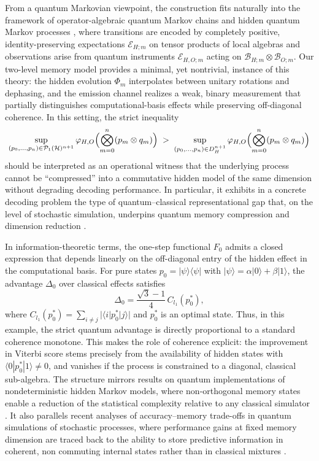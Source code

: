 \documentclass[12pt, reco]{article}
\begin{document}
From a quantum Markovian viewpoint, the construction fits naturally into the framework of operator-algebraic quantum Markov chains \cite{accardi1974} and hidden quantum Markov processes  \cite{AGLS24Q}, where transitions are encoded by completely positive, identity-preserving expectations \(\mathcal{E}_{H;m}\) on tensor products of local algebras and observations arise from quantum instruments \(\mathcal{E}_{H,O;m}\) acting on \(\mathcal{B}_{H;m}\otimes\mathcal{B}_{O;m}\). Our two-level memory model provides a minimal, yet nontrivial, instance of this theory: the hidden evolution \(\Phi_m\) interpolates between unitary rotations and dephasing, and the emission channel realizes a weak, binary measurement that partially distinguishes computational-basis effects while preserving off-diagonal coherence. In this setting, the strict inequality
\[
\sup_{(p_0,\dots,p_n)\in\mathcal{P}_1(\mathcal{H})^{n+1}}
\varphi_{H,O}\Bigl(\bigotimes_{m=0}^n (p_m\otimes q_m)\Bigr)
\;>\;
\sup_{(p_0,\dots,p_n)\in D_H^{n+1}}
\varphi_{H,O}\Bigl(\bigotimes_{m=0}^n (p_m\otimes q_m)\Bigr)
\]
should be interpreted as an operational witness that the underlying process cannot be “compressed” into a commutative hidden model of the same dimension without degrading decoding performance. In particular, it exhibits in a concrete decoding problem the type of quantum–classical representational gap that, on the level of stochastic simulation, underpins quantum memory compression and dimension reduction \cite{Elliot21,YangElliot25}.

In information-theoretic terms, the one-step functional \(F_0\) admits a closed expression that depends linearly on the off-diagonal entry of the hidden effect in the computational basis. For pure states \(p_0 = |\psi\rangle\langle\psi|\) with \(|\psi\rangle = \alpha|0\rangle + \beta|1\rangle\), the advantage \(\Delta_0\) over classical effects satisfies
\[
\Delta_0
=
\frac{\sqrt{3}-1}{4}\,C_{l_1}(p_0^*),
\]
where \(C_{l_1}(p_0^*) = \sum_{i\neq j}|\langle i|p_0^*|j\rangle|\) and \(p_0^*\) is an optimal state. Thus, in this example, the strict quantum advantage is directly proportional to a standard coherence monotone. This makes the role of coherence explicit: the improvement in Viterbi score stems precisely from the availability of hidden states with \(\langle 0|p_0^*|1\rangle\neq 0\), and vanishes if the process is constrained to a diagonal, classical sub-algebra. The structure mirrors results on quantum implementations of nondeterministic hidden Markov models, where non-orthogonal memory states enable a reduction of the statistical complexity relative to any classical simulator \cite{Elliot21}. It also parallels recent analyses of accuracy–memory trade-offs in quantum simulations of stochastic processes, where performance gains at fixed memory dimension are traced back to the ability to store predictive information in coherent, non commuting internal states rather than in classical mixtures \cite{Banchi24}.
\end{document}
